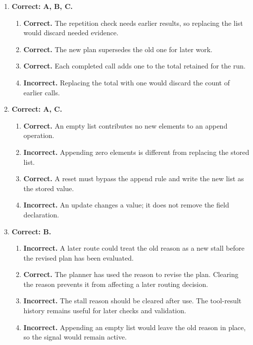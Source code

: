 \begin{enumerate}[start=11,itemsep=0.7\baselineskip]
\item[{\hyperref[exercise:14]{14.}}] \begin{minipage}[t]{\linewidth}
\textbf{Correct: A, B, C.}
\begin{enumerate}[label=\textnormal{(\Alph*)},leftmargin=*,itemsep=0pt]
\item \textbf{Correct.} The repetition check needs earlier results, so replacing the list would discard needed evidence.
\item \textbf{Correct.} The new plan supersedes the old one for later work.
\item \textbf{Correct.} Each completed call adds one to the total retained for the run.
\item \textbf{Incorrect.} Replacing the total with one would discard the count of earlier calls.
\end{enumerate}
\end{minipage}

\item[{\hyperref[exercise:15]{15.}}] \begin{minipage}[t]{\linewidth}
\textbf{Correct: A, C.}
\begin{enumerate}[label=\textnormal{(\Alph*)},leftmargin=*,itemsep=0pt]
\item \textbf{Correct.} An empty list contributes no new elements to an append operation.
\item \textbf{Incorrect.} Appending zero elements is different from replacing the stored list.
\item \textbf{Correct.} A reset must bypass the append rule and write the new list as the stored value.
\item \textbf{Incorrect.} An update changes a value; it does not remove the field declaration.
\end{enumerate}
\end{minipage}

\item[{\hyperref[exercise:16]{16.}}] \begin{minipage}[t]{\linewidth}
\textbf{Correct: B.}
\begin{enumerate}[label=\textnormal{(\Alph*)},leftmargin=*,itemsep=0pt]
\item \textbf{Incorrect.} A later route could treat the old reason as a new stall before the revised plan has been evaluated.
\item \textbf{Correct.} The planner has used the reason to revise the plan. Clearing the reason prevents it from affecting a later routing decision.
\item \textbf{Incorrect.} The stall reason should be cleared after use. The tool-result history remains useful for later checks and validation.
\item \textbf{Incorrect.} Appending an empty list would leave the old reason in place, so the signal would remain active.
\end{enumerate}
\end{minipage}


\end{enumerate}
